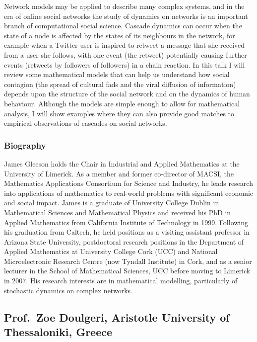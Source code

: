 \documentclass[12pt,a4paper]{article}
\begin{document}
Network models may be applied to describe many complex systems, and in the era of online social networks the study of dynamics on networks is an important branch of computational social science.  Cascade dynamics can occur when the state of a node is affected by the states of its neighbours in the network, for example when a Twitter user is inspired to retweet a message that she received from a user she follows, with one event (the retweet) potentially causing further events (retweets by followers of followers) in a chain reaction. In this talk I will review some mathematical models that can help us understand how social contagion (the spread of cultural fads and the viral diffusion of information) depends upon the structure of the social network and on the dynamics of human behaviour. Although the models are simple enough to allow for mathematical analysis, I will show examples where they can also provide good matches to empirical observations of cascades on social networks.

\subsubsection{Biography}

James Gleeson holds the Chair in Industrial and Applied Mathematics at the University of Limerick. As a member and former co-director of MACSI, the Mathematics Applications Consortium for Science and Industry, he leads research into applications of mathematics to real-world problems with significant economic and social impact. James is a graduate of University College Dublin in Mathematical Sciences and Mathematical Physics and received his PhD in Applied Mathematics from California Institute of Technology in 1999. Following his graduation from Caltech, he held positions as a visiting assistant professor in Arizona State University, postdoctoral research positions in the Department of Applied Mathematics at University College Cork (UCC) and National Microelectronic Research Centre (now Tyndall Institute) in Cork, and as a senior lecturer in the School of Mathematical Sciences, UCC before moving to Limerick in 2007. His research interests are in mathematical modelling, particularly of stochastic dynamics on complex networks.

\subsection{Prof.~Zoe Doulgeri, Aristotle University of Thessaloniki, Greece}
\end{document}
